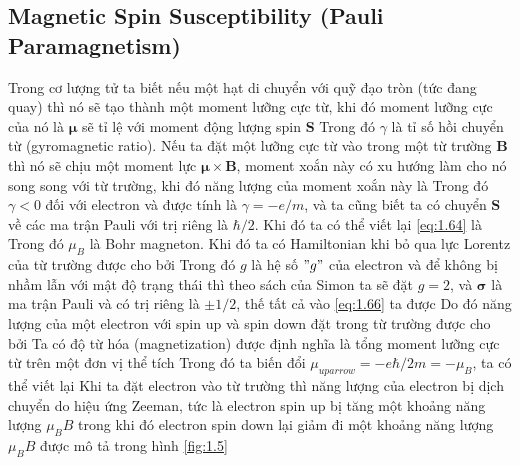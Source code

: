 \subsection{Magnetic Spin Susceptibility (Pauli Paramagnetism)}
Trong cơ lượng tử ta biết nếu một hạt di chuyển với quỹ đạo tròn (tức đang quay) thì nó sẽ tạo thành một moment lưỡng cực từ, khi đó moment lưỡng cực của nó là $\mathbf{\mu}$ sẽ tỉ lệ với moment động lượng spin $\mathbf{S}$
Trong đó $\gamma$ là tỉ số hồi chuyển từ (gyromagnetic ratio). Nếu ta đặt một lưỡng cực từ vào trong một từ trường $\mathbf{B}$ thì nó sẽ chịu một moment lực $\mathbf{\mu}\times\mathbf{B}$, moment xoắn này có xu hướng làm cho nó song song với từ trường, khi đó năng lượng của moment xoắn này là
Trong đó $\gamma <0$ đối với electron và được tính là $\gamma = -e/m$, và ta cũng biết ta có chuyển $\mathbf{S}$ về các ma trận Pauli với trị riêng là $\hbar/2$. Khi đó ta có thể viết lại \eqref{eq:1.64} là
Trong đó $\mu_B$ là Bohr magneton. Khi đó ta có Hamiltonian khi bỏ qua lực Lorentz của từ trường được cho bởi
Trong đó $g$ là hệ số $"g"$ của electron và để không bị nhầm lẫn với mật độ trạng thái thì theo sách của Simon ta sẽ đặt $g=2$, và $\mathbf{\sigma}$ là ma trận Pauli và có trị riêng là $\pm 1/2$, thế tất cả vào \eqref{eq:1.66} ta được
Do đó năng lượng của một electron với spin up và spin down đặt trong từ trường được cho bởi
\indent Ta có độ từ hóa (magnetization) được định nghĩa là tổng moment lưỡng cực từ trên một đơn vị thể tích
Trong đó ta biến đổi $\mu_{uparrow} = -e\hbar/2m = - \mu_B$, ta có thể viết lại 
Khi ta đặt electron vào từ trường thì năng lượng của electron bị dịch chuyển do hiệu ứng Zeeman, tức là electron spin up bị tăng một khoảng năng lượng $\mu_B B$ trong khi đó electron spin down lại giảm đi một khoảng năng lượng $\mu_B B$ được mô tả trong hình \ref{fig:1.5}
